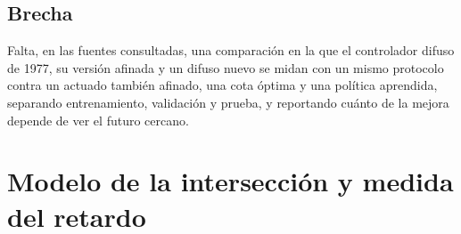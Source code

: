 \documentclass[journal]{IEEEtran}
\begin{document}
\subsection{Brecha}
Falta, en las fuentes consultadas, una comparación en la que el controlador difuso de 1977, su versión afinada y un difuso nuevo se midan con un mismo protocolo contra un actuado también afinado, una cota óptima y una política aprendida, separando entrenamiento, validación y prueba, y reportando cuánto de la mejora depende de ver el futuro cercano.

\section{Modelo de la intersección y medida del retardo}
\label{sec:modelo}
\end{document}
